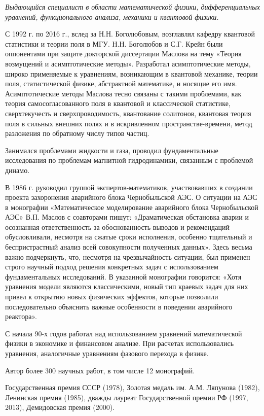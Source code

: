 {\it Выдающийся специалист в области математической физики, дифференциальных уравнений, функционального анализа, механики и квантовой физики.

С 1992 г. по 2016 г., вслед за Н.Н. Боголюбовым, возглавлял кафедру квантовой статистики и теории поля в МГУ.  Н.Н. Боголюбов и С.Г. Крейн были оппонентами при защите докторской диссертации Маслова на тему «Теория возмущений и асимптотические методы». Разработал асимптотические методы, широко применяемые к уравнениям, возникающим в квантовой механике, теории поля, статистической физике, абстрактной математике, и носящие его имя. Асимптотические методы Маслова тесно связаны с такими проблемами, как теория самосогласованного поля в квантовой и классической статистике, сверхтекучесть и сверхпроводимость, квантование солитонов, квантовая теория поля в сильных внешних полях и в искривленном пространстве-времени, метод разложения по обратному числу типов частиц.

Занимался проблемами жидкости и газа, проводил фундаментальные исследования по проблемам магнитной гидродинамики, связанным с проблемой динамо.

В 1986 г. руководил группой экспертов-математиков, участвовавших в создании проекта захоронения аварийного блока Чернобыльской АЭС. О ситуации на АЭС в монографии «Математическое моделирование аварийного блока Чернобыльской АЭС» В.П. Маслов с соавторами пишут: «Драматическая обстановка аварии и осознанная ответственность за обоснованность выводов и рекомендаций обусловливали, несмотря на сжатые сроки исполнения, особенно тщательный и беспристрастный анализ всей совокупности полученных данных». Здесь весьма важно подчеркнуть, что, несмотря на чрезвычайность ситуации, был применен строго научный подход решения конкретных задач с использованием фундаментальных исследований.  В указанной монографии говорится: «Хотя уравнения модели являются классическими, новый тип краевых задач для них привел к открытию новых физических эффектов, которые позволили последовательно объяснить важные особенности в поведении аварийного реактора».

С начала 90-х годов работал над использованием уравнений математической физики в экономике и финансовом анализе. При расчетах использовались уравнения, аналогичные уравнениям фазового перехода в физике.

Автор более 300 научных работ, в том числе 12 монографий.

Государственная премия СССР (1978), Золотая медаль им. А.М. Ляпунова (1982), Ленинская премия (1985), дважды лауреат Государственной премии РФ (1997, 2013), Демидовская премия (2000).}

